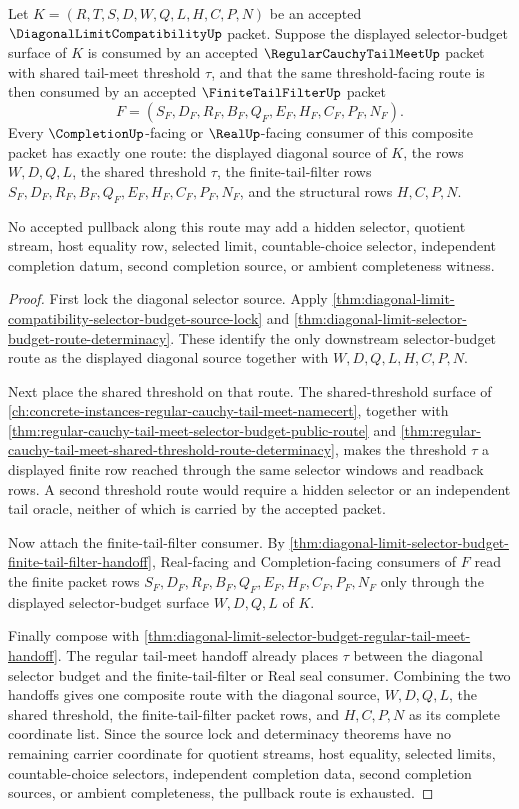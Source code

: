 \begin{theorem}
\label{thm:diagonal-limit-selector-budget-tail-meet-pullback-exhaustion}
Let $K=(R,T,S,D,W,Q,L,H,C,P,N)$ be an accepted $\DiagonalLimitCompatibilityUp$ packet. Suppose the displayed selector-budget surface of $K$ is consumed by an accepted $\RegularCauchyTailMeetUp$ packet with shared tail-meet threshold $\tau$, and that the same threshold-facing route is then consumed by an accepted $\FiniteTailFilterUp$ packet
$$
F=(S_F,D_F,R_F,B_F,Q_F,E_F,H_F,C_F,P_F,N_F).
$$
Every $\CompletionUp$-facing or $\RealUp$-facing consumer of this composite packet has exactly one route: the displayed diagonal source of $K$, the rows $W,D,Q,L$, the shared threshold $\tau$, the finite-tail-filter rows $S_F,D_F,R_F,B_F,Q_F,E_F,H_F,C_F,P_F,N_F$, and the structural rows $H,C,P,N$.

No accepted pullback along this route may add a hidden selector, quotient stream, host equality row, selected limit, countable-choice selector, independent completion datum, second completion source, or ambient completeness witness.
\end{theorem}
\begin{proof}
First lock the diagonal selector source. Apply \autoref{thm:diagonal-limit-compatibility-selector-budget-source-lock} and \autoref{thm:diagonal-limit-selector-budget-route-determinacy}. These identify the only downstream selector-budget route as the displayed diagonal source together with $W,D,Q,L,H,C,P,N$.

Next place the shared threshold on that route. The shared-threshold surface of \autoref{ch:concrete-instances-regular-cauchy-tail-meet-namecert}, together with \autoref{thm:regular-cauchy-tail-meet-selector-budget-public-route} and \autoref{thm:regular-cauchy-tail-meet-shared-threshold-route-determinacy}, makes the threshold $\tau$ a displayed finite row reached through the same selector windows and readback rows. A second threshold route would require a hidden selector or an independent tail oracle, neither of which is carried by the accepted packet.

Now attach the finite-tail-filter consumer. By \autoref{thm:diagonal-limit-selector-budget-finite-tail-filter-handoff}, Real-facing and Completion-facing consumers of $F$ read the finite packet rows $S_F,D_F,R_F,B_F,Q_F,E_F,H_F,C_F,P_F,N_F$ only through the displayed selector-budget surface $W,D,Q,L$ of $K$.

Finally compose with \autoref{thm:diagonal-limit-selector-budget-regular-tail-meet-handoff}. The regular tail-meet handoff already places $\tau$ between the diagonal selector budget and the finite-tail-filter or Real seal consumer. Combining the two handoffs gives one composite route with the diagonal source, $W,D,Q,L$, the shared threshold, the finite-tail-filter packet rows, and $H,C,P,N$ as its complete coordinate list. Since the source lock and determinacy theorems have no remaining carrier coordinate for quotient streams, host equality, selected limits, countable-choice selectors, independent completion data, second completion sources, or ambient completeness, the pullback route is exhausted.
\end{proof}
